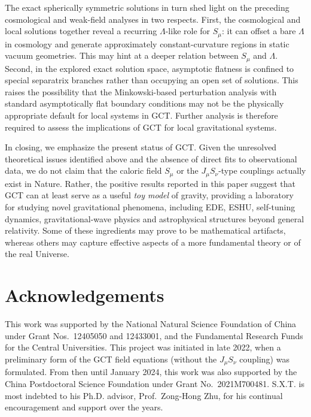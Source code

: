 \documentclass[aps,prd,twocolumn]{revtex4-2}
\renewcommand\theequation{\arabic{section}.\arabic{equation}}
\begin{document}
The exact spherically symmetric solutions in turn shed light on the preceding cosmological and weak-field analyses in two respects. First, the cosmological and local solutions together reveal a recurring $\Lambda$-like role for $S_\mu$: it can offset a bare $\Lambda$ in cosmology and generate approximately constant-curvature regions in static vacuum geometries. This may hint at a deeper relation between $S_\mu$ and $\Lambda$. Second, in the explored exact solution space, asymptotic flatness is confined to special separatrix branches rather than occupying an open set of solutions. This raises the possibility that the Minkowski-based perturbation analysis with standard asymptotically flat boundary conditions may not be the physically appropriate default for local systems in GCT. Further analysis is therefore required to assess the implications of GCT for local gravitational systems.

In closing, we emphasize the present status of GCT. Given the unresolved theoretical issues identified above and the absence of direct fits to observational data, we do not claim that the caloric field $S_\mu$ or the $J_\mu S_\nu$-type couplings actually exist in Nature. Rather, the positive results reported in this paper suggest that GCT can at least serve as a useful \textit{toy model} of gravity, providing a laboratory for studying novel gravitational phenomena, including EDE, ESHU, self-tuning dynamics, gravitational-wave physics and astrophysical structures beyond general relativity. Some of these ingredients may prove to be mathematical artifacts, whereas others may capture effective aspects of a more fundamental theory or of the real Universe.


\section*{Acknowledgements}
This work was supported by the National Natural Science Foundation of China under Grant Nos.~12405050 and 12433001, and the Fundamental Research Funds for the Central Universities. This project was initiated in late 2022, when a preliminary form of the GCT field equations (without the $J_\mu S_\nu$ coupling) was formulated. From then until January 2024, this work was also supported by the China Postdoctoral Science Foundation under Grant No.~2021M700481. S.X.T. is most indebted to his Ph.D. advisor, Prof.~Zong-Hong Zhu, for his continual encouragement and support over the years.


\appendix
\renewcommand{\thesection}{\Alph{section}}
\renewcommand{\theequation}{\thesection.\arabic{equation}}
\end{document}
